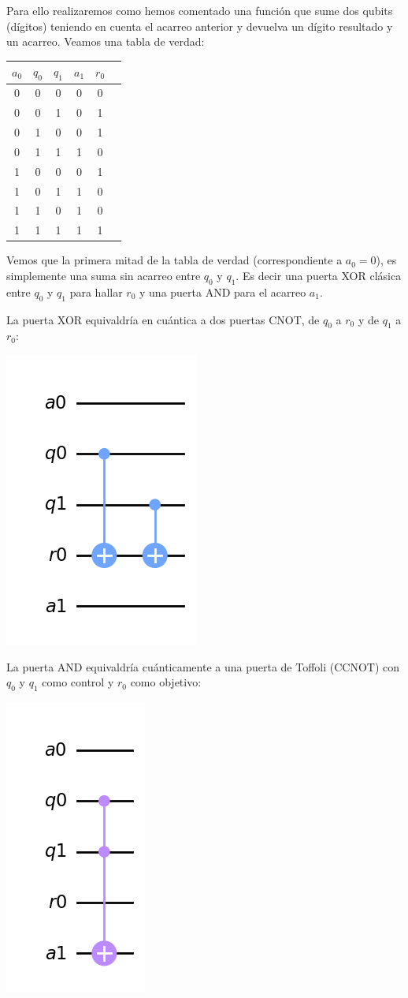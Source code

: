 Para ello realizaremos como hemos comentado una función que sume dos qubits (dígitos) teniendo en cuenta el acarreo anterior y devuelva un dígito resultado y un acarreo.
Veamos una tabla de verdad:

\begin{center}
    \begin{tabular}{|c|c|c||c|c|c|}
        \hline
        $a_0$ & $q_0$ & $q_1$ & $a_1$ & $r_0$\\
        \hline
        \hline
        0 & 0 & 0 & 0 & 0 \\
        0 & 0 & 1 & 0 & 1 \\
        0 & 1 & 0 & 0 & 1 \\
        0 & 1 & 1 & 1 & 0 \\
        \hline
        1 & 0 & 0 & 0 & 1 \\
        1 & 0 & 1 & 1 & 0 \\
        1 & 1 & 0 & 1 & 0 \\
        1 & 1 & 1 & 1 & 1 \\
        \hline
    \end{tabular}
\end{center}

Vemos que la primera mitad de la tabla de verdad (correspondiente a $a_0=0$), es simplemente una suma sin acarreo entre $q_0$ y $q_1$. Es decir una puerta XOR clásica entre $q_0$ y $q_1$ para hallar $r_0$ y una puerta AND para el acarreo $a_1$. 

La puerta XOR equivaldría en cuántica a dos puertas CNOT, de $q_0$ a $r_0$ y de $q_1$ a $r_0$:

\begin{center}
    \includegraphics[width=0.2\linewidth]{Imagenes/2CNOTS_q0r0_q1r0.png}
    \label{fig:2CNOTS_q0r0_q1r0}
\end{center}



La puerta AND equivaldría cuánticamente a una puerta de Toffoli (CCNOT) con $q_0$ y $q_1$ como control y $r_0$ como objetivo:

\begin{center}
    \includegraphics[width=0.2\linewidth]{Imagenes/1CCNOT_q0q1a1.png}
    \label{fig:1CCNOT_q0q1a1}
\end{center}




